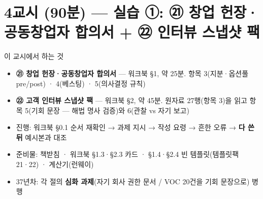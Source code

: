 \section{4교시 (90분) — 실습 ①: ㉑ 창업 헌장·공동창업자 합의서 + ㉒ 인터뷰 스냅샷 팩}
\begin{frame}{이 교시에서 하는 것}
\begin{itemize}
\item \textbf{㉑ 창업 헌장·공동창업자 합의서} — 워크북 §1, 약 25분. 항목 3(지분·옵션풀 pre/post) · 4(베스팅) · 5(의사결정 규칙)
\item \textbf{㉒ 고객 인터뷰 스냅샷 팩} — 워크북 §2, 약 45분. 원자료 27행(항목 3)을 읽고 항목 5(기회 문장 — 해법 명사 검증)와 6(관찰 vs 자기 보고)
\item 진행: 워크북 §0.1 순서 재확인 → 과제 지시 → 작성 요령 → 흔한 오류 → \textbf{다 쓴 뒤} 예시본과 대조
\item 준비물: 책받침 · 워크북 §1.3·§2.3 카드 · §1.4·§2.4 빈 템플릿(템플릿팩 21·22) · 계산기(런웨이)
\item 3\til{}7년차: 각 절의 \textbf{심화 과제}(자기 회사 권한 문서 / VOC 20건을 기회 문장으로) 병행
\end{itemize}
\end{frame}


